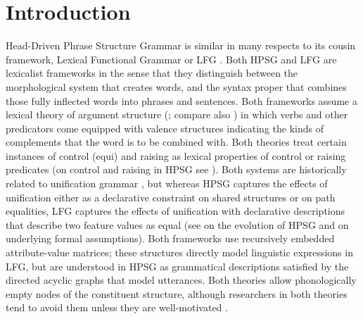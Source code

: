 \section{Introduction} 
\label{intro-sec}
Head-Driven Phrase Structure Grammar is similar in many respects to its cousin framework, Lexical Functional Grammar or LFG \citep{BATW2016a,dalrymple;ea19}.  Both HPSG and LFG are lexicalist frameworks in the sense that they distinguish between the morphological system that creates words, and the syntax proper that combines those fully inflected words into phrases and sentences.  Both frameworks assume a lexical theory of argument structure (\citealp{MWArgSt}; compare also ) in which verbs and other predicators come equipped with valence structures indicating the kinds of complements that the word is to be combined with.  Both theories treat certain instances of control (equi) and raising as lexical properties of control or raising predicates (on control and raising in HPSG see ).  Both systems are historically related to unification grammar \citep{Kay84a-u}, but whereas HPSG captures the effects of unification either as a declarative constraint on shared structures or on path equalities, LFG captures the effects of unification with declarative descriptions that describe two feature values as equal  (see  on the evolution of HPSG and  on underlying formal assumptions). Both frameworks use recursively embedded attribute-value matrices; these structures directly model linguistic expressions in LFG, but are understood in HPSG as grammatical descriptions satisfied by the directed acyclic graphs that model utterances.
%
Both theories allow phonologically empty nodes of the constituent structure, although researchers in both theories tend to avoid them unless they are well-motivated \citep[734--742]{SF94a-unlinked,Berman97a,dalrymple;ea19}.   


